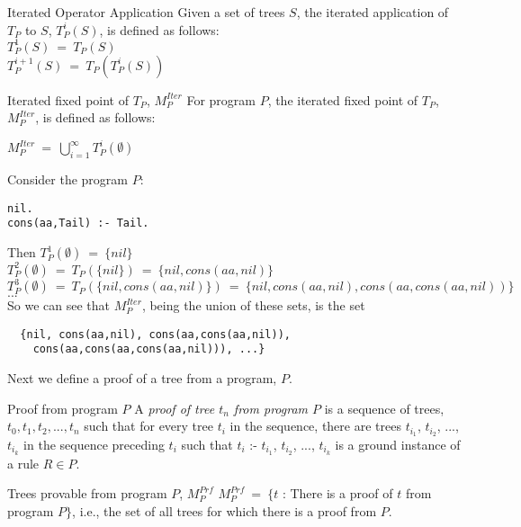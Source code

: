 \begin{definition}{Iterated Operator Application}
  Given a set of trees $S$, the iterated application of $T_P$ to $S$,
  $T_P^i(S)$, is defined as follows: \\
  $T_P^1(S)~=~T_P(S)$ \\
  $T_P^{i+1}(S)~=~T_P(T_P^i(S))$
\end{definition}

\begin{definition}{Iterated fixed point of $T_P$, $M_P^{Iter}$}
  For program $P$, the iterated fixed point of $T_P$, $M_P^{Iter}$, is
  defined as follows:

  $M_P^{Iter}~=~\bigcup_{i=1}^\infty T_P^i(\emptyset)$
\end{definition}

\begin{example}
Consider the program $P$:
\begin{verbatim}
nil.
cons(aa,Tail) :- Tail.
\end{verbatim}
Then
$T_P^1(\emptyset)~=~\{nil\}$\\
$T_P^2(\emptyset)~=~T_P(\{nil\})~=~\{nil,cons(aa,nil)\}$\\
$T_P^3(\emptyset)~=~T_P(\{nil,cons(aa,nil)\})~=~\{nil,cons(aa,nil),cons(aa,cons(aa,nil))\}$\\
$...$\\
So we can see that $M_P^{Iter}$, being the union of these sets, is the set
\begin{verbatim}
  {nil, cons(aa,nil), cons(aa,cons(aa,nil)),
    cons(aa,cons(aa,cons(aa,nil))), ...}
\end{verbatim}
\end{example}

Next we define a proof of a tree from a program, $P$.  

\begin{definition}{Proof from program $P$}
  A {\em proof of tree $t_n$ from program $P$} is a sequence of trees,
  $t_0, t_1, t_2, ..., t_n$ such that for every tree $t_i$ in the
  sequence, there are trees $t_{i_1}$, $t_{i_2}$, ..., $t_{i_k}$ in
  the sequence preceding $t_i$ such that $t_i$ :- $t_{i_1}$, $t_{i_2}$,
  ..., $t_{i_k}$ is a ground instance of a rule $R \in P$.
\end{definition}

\begin{definition}{Trees provable from program $P$, $M_P^{Prf}$}
$M_P^{Prf}~=~\{t$ : There is a proof of $t$ from program $P\}$, i.e.,
  the set of all trees for which there is a proof from $P$.
\end{definition}

